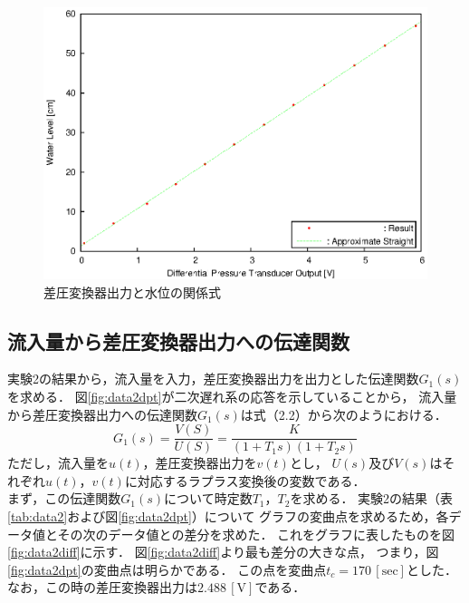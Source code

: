\documentclass[11pt,a4paper]{jsarticle}
\begin{document}
    \begin{figure}[b]
      \begin{center}
        \includegraphics[width=0.9\hsize]{./fig/least_square.eps}
      \end{center}
      \caption{差圧変換器出力と水位の関係式}
      \label{fig:least_square}
    \end{figure}

  \subsection{流入量から差圧変換器出力への伝達関数}
    実験2の結果から，流入量を入力，差圧変換器出力を出力とした伝達関数$G_1(s)$を求める．
    図\ref{fig:data2dpt}が二次遅れ系の応答を示していることから，
    流入量から差圧変換器出力への伝達関数$G_1(s)$は式（2.2）から次のようにおける．
    \begin{equation}
      G_1(s) = \frac{V(S)}{U(S)} = \frac{K}{(1 + T_1 s)(1 + T_2 s)}
    \end{equation}
    ただし，流入量を$u(t)$，差圧変換器出力を$v(t)$とし，
    $U(s)$及び$V(s)$はそれぞれ$u(t)$，$v(t)$に対応するラプラス変換後の変数である．\\
    
    まず，この伝達関数$G_1(s)$について時定数$T_1$，$T_2$を求める．
    実験2の結果（表\ref{tab:data2}および図\ref{fig:data2dpt}）について
    グラフの変曲点を求めるため，各データ値とその次のデータ値との差分を求めた．
    これをグラフに表したものを図\ref{fig:data2diff}に示す．
    図\ref{fig:data2diff}より最も差分の大きな点，
    つまり，図\ref{fig:data2dpt}の変曲点は明らかである．
    この点を変曲点$t_c = 170\,\mathrm{[sec]}$とした．
    なお，この時の差圧変換器出力は$2.488\,\mathrm{[V]}$である．\\
\end{document}
